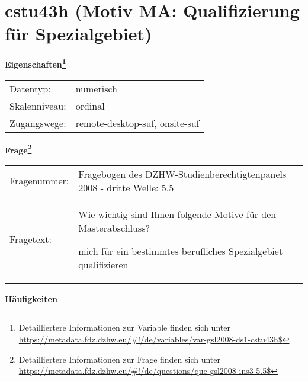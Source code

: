 
    \setcounter{footnote}{0}

    \vspace*{-1.8cm}
	\section{cstu43h (Motiv MA: Qualifizierung für Spezialgebiet)}
	\label{section:cstu43h}



    \vspace*{0.5cm}
    \noindent\textbf{Eigenschaften\footnote{Detailliertere Informationen zur Variable finden sich unter
		\url{https://metadata.fdz.dzhw.eu/\#!/de/variables/var-gsl2008-ds1-cstu43h$}}}\\
	\begin{tabularx}{\hsize}{@{}lX}
	Datentyp: & numerisch \\
	Skalenniveau: & ordinal \\
	Zugangswege: &
	  remote-desktop-suf, 
	  onsite-suf
 \\
    \end{tabularx}



				\vspace*{0.5cm}
                \noindent\textbf{Frage\footnote{Detailliertere Informationen zur Frage finden sich unter
		              \url{https://metadata.fdz.dzhw.eu/\#!/de/questions/que-gsl2008-ins3-5.5$}}}\\
				\begin{tabularx}{\hsize}{@{}lX}
					Fragenummer: &
					  Fragebogen des DZHW-Studienberechtigtenpanels 2008 - dritte Welle:
					  5.5
 \\
					Fragetext: & Wie wichtig sind Ihnen folgende Motive für den Masterabschluss?\par  mich für ein bestimmtes berufliches Spezialgebiet qualifizieren \\
				\end{tabularx}





        		\vspace*{0.5cm}
                \noindent\textbf{Häufigkeiten}

